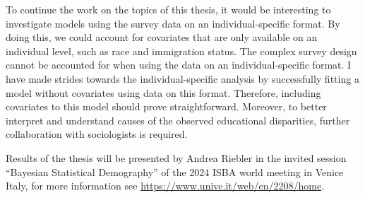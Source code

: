 To continue the work on the topics of this thesis, it would be interesting to investigate models using the survey data on an individual-specific format. By doing this, we could account for covariates that are only available on an individual level, such as race and immigration status. The complex survey design cannot be accounted for when using the data on an individual-specific format. I have made strides towards the individual-specific analysis by successfully fitting a model without covariates using data on this format. Therefore, including covariates to this model should prove straightforward. Moreover, to better interpret and understand causes of the observed educational disparities, further collaboration with sociologists is required.

Results of the thesis will be presented by Andrea Riebler in the invited session “Bayesian Statistical Demography” of the 2024 ISBA world meeting in Venice Italy, for more information see \url{https://www.unive.it/web/en/2208/home}.
